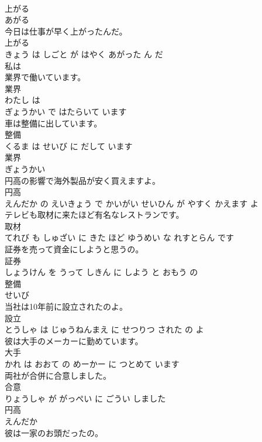 \documentclass[8pt]{extreport}
\begin{document}
\begin{CJK}{UTF8}{min}
\\	上がる	
\\	あがる			
\\	今日は仕事が早く上がったんだ。	
\\	上がる 
\\	きょう は しごと が はやく あがった ん だ			
\\	私は
\\	業界で働いています。	
\\	業界 
\\	わたし は 
\\	ぎょうかい で はたらいて います			
\\	車は整備に出しています。	
\\	整備 
\\	くるま は せいび に だして います			
\\	業界	
\\	ぎょうかい			
\\	円高の影響で海外製品が安く買えますよ。	
\\	円高 
\\	えんだか の えいきょう で かいがい せいひん が やすく かえます よ			
\\	テレビも取材に来たほど有名なレストランです。	
\\	取材 
\\	てれび も しゅざい に きた ほど ゆうめい な れすとらん です			
\\	証券を売って資金にしようと思うの。	
\\	証券 
\\	しょうけん を うって しきん に しよう と おもう の			
\\	整備	
\\	せいび			
\\	当社は10年前に設立されたのよ。	
\\	設立 
\\	とうしゃ は じゅうねんまえ に せつりつ された の よ			
\\	彼は大手のメーカーに勤めています。	
\\	大手 
\\	かれ は おおて の めーかー に つとめて います			
\\	両社が合併に合意しました。	
\\	合意 
\\	りょうしゃ が がっぺい に ごうい しました			
\\	円高	
\\	えんだか			
\\	彼は一家のお頭だったの。	

\end{CJK}
\end{document}

